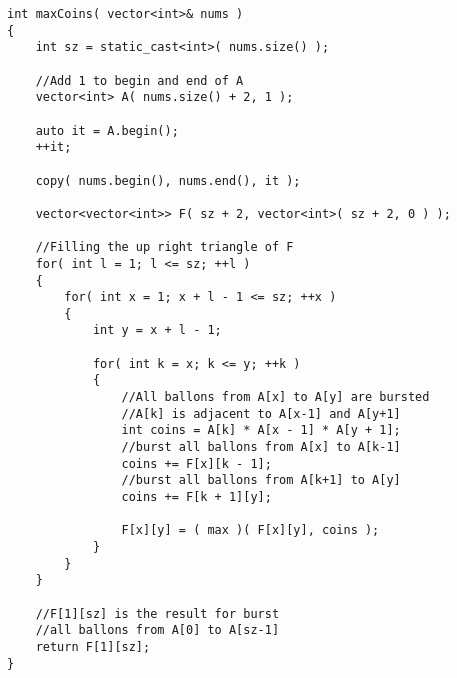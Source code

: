 \begin{lstlisting}[style=customc, caption={Dynamic Programming}]
int maxCoins( vector<int>& nums )
{
    int sz = static_cast<int>( nums.size() );

    //Add 1 to begin and end of A
    vector<int> A( nums.size() + 2, 1 );

    auto it = A.begin();
    ++it;

    copy( nums.begin(), nums.end(), it );

    vector<vector<int>> F( sz + 2, vector<int>( sz + 2, 0 ) );

    //Filling the up right triangle of F
    for( int l = 1; l <= sz; ++l )
    {
        for( int x = 1; x + l - 1 <= sz; ++x )
        {
            int y = x + l - 1;

            for( int k = x; k <= y; ++k )
            {
                //All ballons from A[x] to A[y] are bursted
                //A[k] is adjacent to A[x-1] and A[y+1]
                int coins = A[k] * A[x - 1] * A[y + 1];
                //burst all ballons from A[x] to A[k-1]
                coins += F[x][k - 1];
                //burst all ballons from A[k+1] to A[y]
                coins += F[k + 1][y];

                F[x][y] = ( max )( F[x][y], coins );
            }
        }
    }

    //F[1][sz] is the result for burst
    //all ballons from A[0] to A[sz-1]
    return F[1][sz];
}

\end{lstlisting}